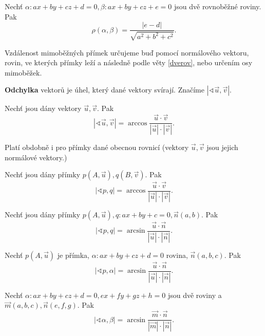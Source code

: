 \begin{veta}\label{dverov}
    Nechť $\alpha:ax+by+cz+d=0,\beta:ax+by+cz+e=0$ jsou dvě rovnoběžné roviny. Pak
    $$\rho(\alpha,\beta)=\frac{|e-d|}{\sqrt{a^2+b^2+c^2} }.$$
\end{veta}

\begin{pozn}
    Vzdálenost mimoběžných přímek určujeme buď pomocí normálového vektoru, rovin,
    ve kterých přímky leží a následně podle věty \ref{dverov}, nebo určením
    osy mimoběžek.
\end{pozn}

\begin{definition}
    \textbf{Odchylka} vektorů je úhel, který dané vektory svírají. Značíme $|\sphericalangle \vec u, \vec v|.$
\end{definition}

\begin{veta}
    Nechť jsou dány vektory $\vec u, \vec v.$ Pak
    $$|\sphericalangle \vec u, \vec v|=\arccos \frac{\vec u \cdot \vec v}{|\vec u|\cdot |\vec v|}.$$
\end{veta}

\begin{pozn}
    Platí obdobně i pro přímky dané obecnou rovnicí (vektory $\vec u, \vec v$ jsou
    jejich normálové vektory.)
\end{pozn}

\begin{veta}
    Nechť jsou dány přímky $p(A,\vec u), q(B, \vec v).$ Pak
    $$|\sphericalangle p, q|=\arccos \frac{\vec u \cdot \vec v}{|\vec u|\cdot |\vec v|}.$$
\end{veta}

\begin{veta}
Nechť jsou dány přímky $p(A,\vec u), q:ax+by+c=0, \vec n(a,b).$ Pak
$$|\sphericalangle p, q|=\arcsin \frac{\vec u \cdot \vec n}{|\vec u|\cdot |\vec n|}.$$
\end{veta}

\begin{veta}
    Nechť $p(A,\vec u)$ je přímka, $\alpha:ax+by+cz+d=0$ rovina, $\vec n(a,b,c)$. Pak
    $$|\sphericalangle p, \alpha|=\arcsin \frac{\vec u \cdot \vec n}{|\vec u|\cdot |\vec n|}.$$
\end{veta}

\begin{veta}
    Nechť $\alpha:ax+by+cz+d=0, ex+fy+gz+h=0$ jsou dvě roviny a $\vec m(a,b,c), \vec n(e,f,g).$
    Pak
    $$|\sphericalangle \alpha, \beta|=\arcsin \frac{\vec m \cdot \vec n}{|\vec m|\cdot |\vec n|}.$$
\end{veta}
